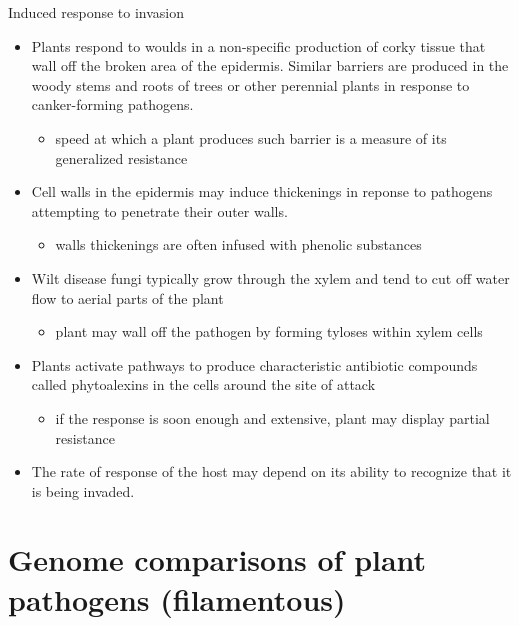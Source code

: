 \documentclass[11pt,dvipsnames,ignorenonframetext,aspectratio=169]{beamer}
\providecommand{\tightlist}{%
  \setlength{\itemsep}{0pt}\setlength{\parskip}{0pt}}
\begin{document}
\begin{frame}{Induced response to invasion}
\protect\hypertarget{induced-response-to-invasion}{}
\footnotesize

\begin{itemize}
\tightlist
\item
  Plants respond to woulds in a non-specific production of corky tissue
  that wall off the broken area of the epidermis. Similar barriers are
  produced in the woody stems and roots of trees or other perennial
  plants in response to canker-forming pathogens.

  \begin{itemize}
  \tightlist
  \item
    speed at which a plant produces such barrier is a measure of its
    generalized resistance
  \end{itemize}
\item
  Cell walls in the epidermis may induce thickenings in reponse to
  pathogens attempting to penetrate their outer walls.

  \begin{itemize}
  \tightlist
  \item
    walls thickenings are often infused with phenolic substances
  \end{itemize}
\item
  Wilt disease fungi typically grow through the xylem and tend to cut
  off water flow to aerial parts of the plant

  \begin{itemize}
  \tightlist
  \item
    plant may wall off the pathogen by forming tyloses within xylem
    cells
  \end{itemize}
\item
  Plants activate pathways to produce characteristic antibiotic
  compounds called phytoalexins in the cells around the site of attack

  \begin{itemize}
  \tightlist
  \item
    if the response is soon enough and extensive, plant may display
    partial resistance
  \end{itemize}
\item
  The rate of response of the host may depend on its ability to
  recognize that it is being invaded.
\end{itemize}
\end{frame}

\hypertarget{genome-comparisons-of-plant-pathogens-filamentous}{%
\section{Genome comparisons of plant pathogens
(filamentous)}\label{genome-comparisons-of-plant-pathogens-filamentous}}
\end{document}
